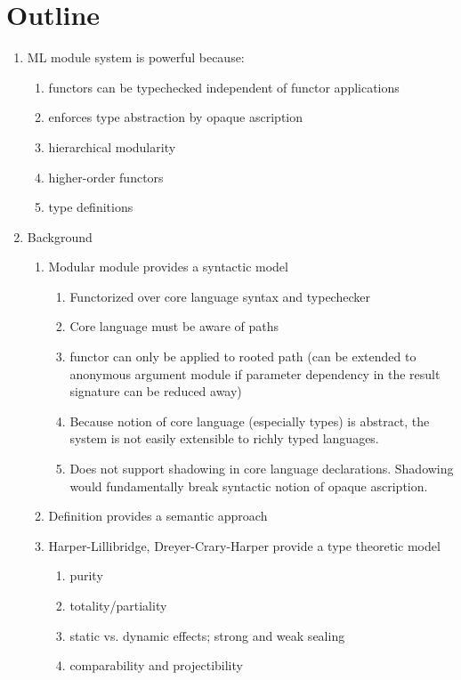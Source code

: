 \documentclass[9pt]{sigplanconf}
\begin{document}
{
\section{Outline}
\begin{enumerate}
	\item ML module system is powerful because:
	\begin{enumerate}
		\item functors can be typechecked independent of functor applications
		\item enforces type abstraction by opaque ascription
		\item hierarchical modularity
		\item higher-order functors
		\item type definitions
	\end{enumerate}
	\item Background
	\begin{enumerate}
		\item Modular module\cite{leroy00} provides a syntactic model 
		\begin{enumerate}
			\item Functorized over core language syntax and typechecker
			\item Core language must be aware of paths
			\item functor can only be applied to rooted path (can be extended to anonymous argument module if parameter dependency in the result signature can be reduced away)
			\item Because notion of core language (especially types) is abstract, the system is not easily extensible to richly typed languages. 
			\item Does not support shadowing in core language declarations. Shadowing would fundamentally break syntactic notion of opaque ascription. 
		\end{enumerate}
		\item Definition \cite{mthm97} provides a semantic approach
		\item Harper-Lillibridge\cite{lillibridge94}, Dreyer-Crary-Harper\cite{dhc03} provide a type theoretic model
		\begin{enumerate}
			\item purity
			\item totality/partiality
			\item static vs. dynamic effects; strong and weak sealing
			\item comparability and projectibility
		\end{enumerate}

\end{enumerate}
\end{enumerate}}
\end{document}
